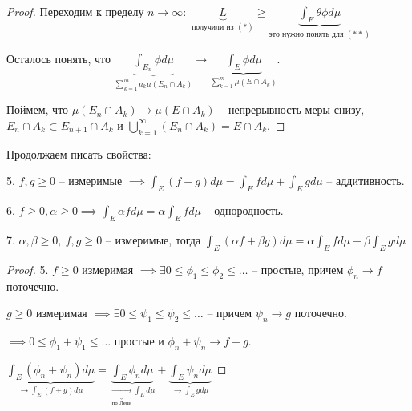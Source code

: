 \begin{proof}
    Переходим к пределу $n \rightarrow \infty: $ $\underbrace{L}_{\text{получили из }(*)} \geq \underbrace{\int_E {\theta \phi d \mu}}_{\text{это нужно понять для }(**)}$

    Осталось понять, что $\underbrace{\int_{E_n} {\phi d \mu}}_{\sum_{k=1}^{m} a_k \mu (E_n \cap A_k)} \rightarrow \underbrace{\int_E {\phi d \mu}}_{\sum_{k=1}^{m} \mu (E \cap A_k)}$.

    Поймем, что $\mu (E_n \cap A_k) \rightarrow \mu (E \cap A_k)$ -- непрерывность меры снизу, $E_n \cap A_k \subset E_{n+1} \cap A_k$ и $\bigcup_{k=1}^{\infty} (E_n \cap A_k) = E \cap A_k$.
\end{proof}

\begin{properties}
    Продолжаем писать свойства:

    5. $f, g \geq 0$ -- измеримые $\implies \int_E{(f+g) d \mu} = \int_Ef d \mu + \int_E{g d \mu}$ -- аддитивность.

    6. $f \geq 0, \alpha \geq 0 \implies \int_E{\alpha f d \mu} = \alpha \int_E{f d \mu}$ -- однородность.

    7. $\alpha, \beta \geq 0, \ f, g \geq 0$ -- измеримые, тогда $\int_E{(\alpha f + \beta g) d \mu} = \alpha \int_E f d \mu + \beta \int_E g d \mu$
\end{properties}

\begin{proof}
    5. $f \geq 0$ измеримая $\implies \exists 0 \leq \phi_1 \leq \phi_2 \leq \dots$ -- простые, причем $\phi_n \rightarrow f$ поточечно.
    
    $g \geq 0$ измеримая $\implies \exists 0 \leq \psi_1 \leq \psi_2 \leq \dots$ -- причем $\psi_n \rightarrow g$ поточечно.

    $\implies 0 \leq \phi_1 + \psi_1 \leq \dots$ простые и $\phi_n + \psi_n \rightarrow f + g$.


    $\underbrace{\int_E{(\phi_n + \psi_n) d \mu}}_{\rightarrow \int_E{(f+g) d \mu}} = \underbrace{\int_E{\phi_n d \mu}}_{\underbrace{\rightarrow}_{\text{по Леви}} \int_E d \mu} + \underbrace{\int_E{\psi_n d \mu}}_{\rightarrow \int_E{g d \mu}}$
\end{proof}

